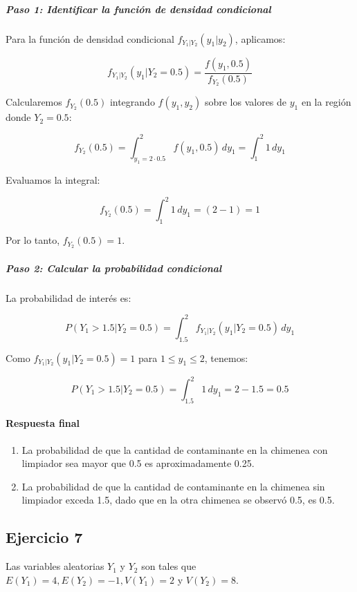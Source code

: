 \documentclass[
]{article}
\providecommand{\tightlist}{%
  \setlength{\itemsep}{0pt}\setlength{\parskip}{0pt}}
\begin{document}
\subparagraph{Paso 1: Identificar la función de densidad condicional}\label{paso-1-identificar-la-funciuxf3n-de-densidad-condicional-1}

Para la función de densidad condicional \(f_{Y_1|Y_2}(y_1 | y_2)\), aplicamos:

\[
f_{Y_1|Y_2}(y_1 | Y_2 = 0.5) = \frac{f(y_1, 0.5)}{f_{Y_2}(0.5)}
\]

Calcularemos \(f_{Y_2}(0.5)\) integrando \(f(y_1, y_2)\) sobre los valores de \(y_1\) en la región donde \(Y_2 = 0.5\):

\[
f_{Y_2}(0.5) = \int_{y_1 = 2 \cdot 0.5}^{2} f(y_1, 0.5) \, dy_1 = \int_{1}^{2} 1 \, dy_1
\]

Evaluamos la integral:

\[
f_{Y_2}(0.5) = \int_{1}^{2} 1 \, dy_1 = (2 - 1) = 1
\]

Por lo tanto, \(f_{Y_2}(0.5) = 1\).

\subparagraph{Paso 2: Calcular la probabilidad condicional}\label{paso-2-calcular-la-probabilidad-condicional-1}

La probabilidad de interés es:

\[
P(Y_1 > 1.5 | Y_2 = 0.5) = \int_{1.5}^{2} f_{Y_1|Y_2}(y_1 | Y_2 = 0.5) \, dy_1
\]

Como \(f_{Y_1|Y_2}(y_1 | Y_2 = 0.5) = 1\) para \(1 \leq y_1 \leq 2\), tenemos:

\[
P(Y_1 > 1.5 | Y_2 = 0.5) = \int_{1.5}^{2} 1 \, dy_1 = 2 - 1.5 = 0.5
\]

\paragraph{Respuesta final}\label{respuesta-final-2}

\begin{enumerate}
\def\labelenumi{\arabic{enumi}.}
\tightlist
\item
  La probabilidad de que la cantidad de contaminante en la chimenea con limpiador sea mayor que 0.5 es aproximadamente 0.25.
\item
  La probabilidad de que la cantidad de contaminante en la chimenea sin limpiador exceda 1.5, dado que en la otra chimenea se observó 0.5, es 0.5.
\end{enumerate}

\subsection{Ejercicio 7}\label{ejercicio-7}

Las variables aleatorias \(Y_{1}\) y \(Y_{2}\) son tales que \(E\left(Y_{1}\right)=4, E\left(Y_{2}\right)=-1, V\left(Y_{1}\right)=2\) y \(V\left(Y_{2}\right)=8\).
\end{document}
